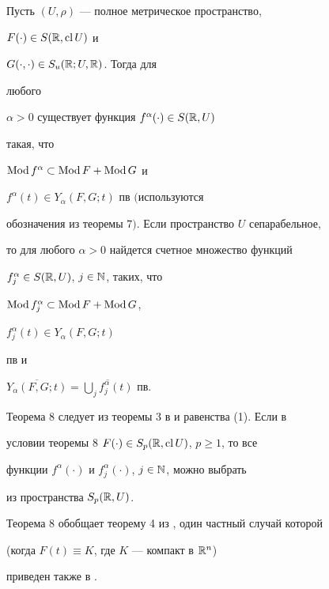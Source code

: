 \begin{thm}


Пусть $(U,\rho)$ --- полное метрическое пространство,


$F(\cdot)\in S(\Bbb R,\operatorname{cl} U)$ и


$G(\cdot,\cdot)\in S_u(\Bbb R;U,\Bbb R)$. Тогда для


любого


$\alpha>0$ существует функция $f^\alpha(\cdot)\in S(\Bbb R,U)$


такая, что


$\operatorname{Mod} f^\alpha\subset\operatorname{Mod} F+\operatorname{Mod} G$ и


$f^\alpha(t)\in Y_\alpha(F,G;t)$ пв $($используются


обозначения из теоремы $7)$. Если пространство $U$ сепарабельное,


то для любого $\alpha>0$ найдется счетное множество функций


$f^\alpha_j\in S(\Bbb R,U)$, $j\in\Bbb N$, таких, что


$\operatorname{Mod} f^\alpha_j\subset\operatorname{Mod} F+\operatorname{Mod} G$,


$f^\alpha_j(t)\in Y_\alpha(F,G;t)$


пв и


$\overline{Y_\alpha(F,G;t)}=


\overline{\bigcup\limits_j f^\alpha_j(t)}$ пв.


\end{thm}





Теорема 8 следует из теоремы 3 в \cite{6} и равенства (1). Если в


условии теоремы 8\; $F(\cdot)\in S_p(\Bbb R,\operatorname{cl} U)$, $p\ge 1$, то все


функции $f^\alpha(\cdot)$ и $f^\alpha_j(\cdot)$, $j\in\Bbb N$, можно выбрать


из пространства $S_p(\Bbb R,U)$.


Теорема 8 обобщает теорему 4 из \cite{4}, один частный случай которой


(когда $F(t)\equiv K$, где $K$ --- компакт в $\Bbb R^n$)


приведен также в \cite{18}.








